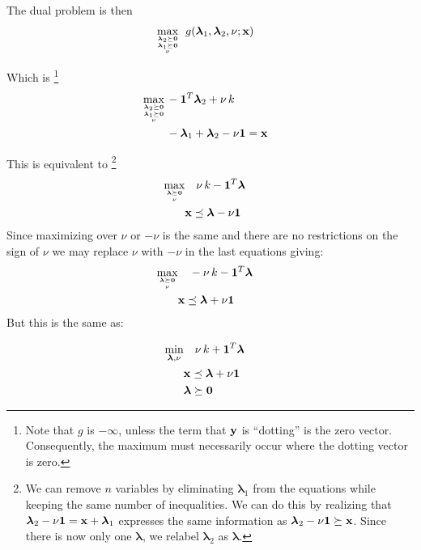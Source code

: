 \documentclass[12pt]{article}
\begin{document}
The dual problem is then
\begin{eqnarray}
	\mathop{\rm max}_{{{\boldsymbol \lambda}_2 \succeq {\bf 0}} \atop {{{\boldsymbol \lambda}_1 \succeq {\bf 0}} \atop \nu}} 
		\; g({\boldsymbol \lambda}_1, {\boldsymbol \lambda}_2, \nu; {\bf x}) & & 
\end{eqnarray}

Which is%
\footnote{Note that $g$ is $-\infty$, unless the term that ${\bf y}$ is ``dotting'' is the zero vector. Consequently, the maximum
must necessarily occur where the dotting vector is zero.}
\begin{eqnarray}
	\mathop{\rm max}_{{{\boldsymbol \lambda}_2 \succeq {\bf 0}} \atop {{{\boldsymbol \lambda}_1 \succeq {\bf 0}} \atop \nu}} 
		 & - {\bf 1}^T {\boldsymbol \lambda}_2 + \nu \, k   & \\ 
		 & - {\boldsymbol \lambda}_1 + {\boldsymbol \lambda}_2 - \nu {\bf 1} = {\bf x} & 
\end{eqnarray}

This is equivalent to%
\footnote{We can remove $n$ variables by eliminating ${\boldsymbol \lambda}_1$ from the equations while keeping
	the same number of inequalities. We can do this by realizing that ${\boldsymbol \lambda}_2 - \nu {\bf 1} = {\bf x} + {\boldsymbol \lambda}_1$ 
	expresses the same information as ${\boldsymbol \lambda}_2 - \nu {\bf 1} \succeq {\bf x}$. Since there is now only one ${\boldsymbol \lambda}$,
we relabel ${\boldsymbol \lambda}_2$ as ${\boldsymbol \lambda}$.}
\begin{eqnarray}
	\mathop{\rm max}_{{{\boldsymbol \lambda} \succeq {\bf 0}} \atop \nu} 
		& \quad \nu \, k - {\bf 1}^T {\boldsymbol \lambda} & \\   
		& {\bf x} \preceq {\boldsymbol \lambda} - \nu {\bf 1} &
 \end{eqnarray}
Since maximizing over $\nu$ or $-\nu$ is the same and there are no restrictions on the sign of $\nu$ we may replace $\nu$ with $-\nu$ 
in the last equations giving:
\begin{eqnarray}
	\mathop{\rm max}_{{{\boldsymbol \lambda} \succeq {\bf 0}} \atop \nu} 
		& \quad -\nu \, k - {{\bf 1}^T \boldsymbol \lambda} & \\ 
	    &  {\bf x} \preceq {\boldsymbol \lambda} + \nu {\bf 1} &
 \end{eqnarray}
But this is the same as:

\begin{eqnarray}
	\mathop{\rm min}_{{\boldsymbol \lambda}, \nu} & \quad \nu \, k + {\bf 1}^T {\boldsymbol \lambda} & \\ 
												  &  {\bf x} \preceq {\boldsymbol \lambda} + \nu {\bf 1} & \\
												  & {\boldsymbol \lambda} \succeq {\bf 0} & 
 \end{eqnarray}
\end{document}
